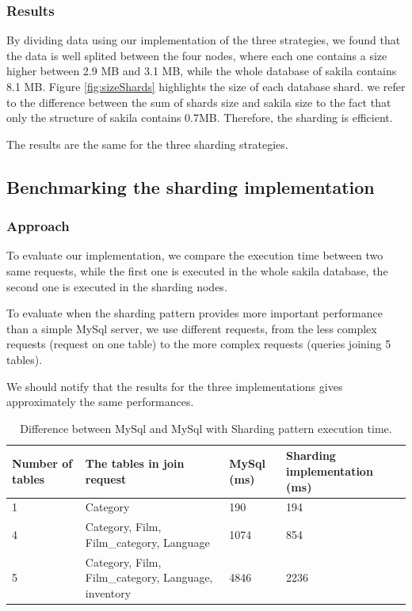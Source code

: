 \documentclass[10pt, conference]{IEEEtran}
\begin{document}
\subsubsection{Results} By dividing data using our implementation of the three strategies, we found that the data is well splited between the four nodes, where each one contains a size higher between 2.9 MB and 3.1 MB, while the whole database of sakila contains 8.1 MB. Figure \ref{fig:sizeShards} highlights the size of each database shard. we refer to the difference between the sum of shards size and sakila size to the fact that only the structure of sakila contains 0.7MB. Therefore, the sharding is efficient.

The results are the same for the three sharding strategies.

\subsection{Benchmarking the sharding implementation}
\label{section:Benchmarking sharding}

\subsubsection{Approach} To evaluate our implementation, we compare the execution time between two same requests, while the first one is executed in the whole sakila database, the second one is executed in the sharding nodes. 

To evaluate when the sharding pattern provides more important performance than a simple MySql server, we use different requests, from the less complex requests (request on one table) to the more complex requests (queries joining 5 tables). 

We should notify that the results for the three implementations gives approximately the same performances.


	\begin{table}
		\begin{center}
			\begin{tabular}{|l|l|l|l|}
				\hline
				Number of tables & The tables in join request & MySql (ms) & Sharding implementation (ms) \\
				\hline
				1 & Category & 190 & 194 \\
				4 & Category, Film, Film\_category, Language  & 1074 & 854 \\
				5 & Category, Film, Film\_category, Language, inventory & 4846 & 2236 \\
				\hline
			\end{tabular}
			\caption{\label{executiontime} Difference between MySql and MySql with Sharding pattern execution time.}
		\end{center}
	\end{table}
\end{document}
